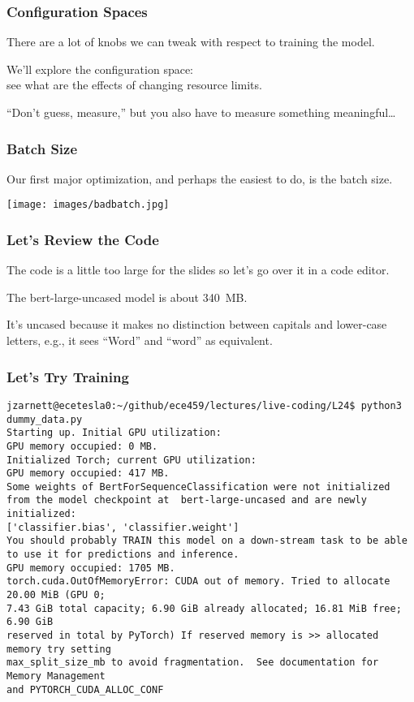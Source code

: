 \begin{frame}
\frametitle{Configuration Spaces}

There are a lot of knobs we can tweak with respect to training the model.

We'll explore the configuration space: \\
\hspace*{2em} see what are the effects of changing resource limits.

``Don't guess, measure,'' but you also have to measure something meaningful\ldots

\end{frame}

\begin{frame}
\frametitle{Batch Size}

Our first major optimization, and perhaps the easiest to do, is the batch size.

\begin{center}
	\texttt{[image: images/badbatch.jpg]}
\end{center}


\end{frame}

\begin{frame}
\frametitle{Let's Review the Code}

The code is a little too large for the slides so let's go over it in a code editor.


The bert-large-uncased model is about 340~MB.

It's uncased because it makes no distinction between capitals and lower-case letters, e.g., it sees ``Word'' and ``word'' as equivalent.

\end{frame}

\begin{frame}[fragile]
\frametitle{Let's Try Training}

{\scriptsize
\begin{verbatim}
jzarnett@ecetesla0:~/github/ece459/lectures/live-coding/L24$ python3 dummy_data.py 
Starting up. Initial GPU utilization:
GPU memory occupied: 0 MB.
Initialized Torch; current GPU utilization:
GPU memory occupied: 417 MB.
Some weights of BertForSequenceClassification were not initialized 
from the model checkpoint at  bert-large-uncased and are newly initialized: 
['classifier.bias', 'classifier.weight']
You should probably TRAIN this model on a down-stream task to be able 
to use it for predictions and inference.
GPU memory occupied: 1705 MB.
torch.cuda.OutOfMemoryError: CUDA out of memory. Tried to allocate 20.00 MiB (GPU 0; 
7.43 GiB total capacity; 6.90 GiB already allocated; 16.81 MiB free; 6.90 GiB 
reserved in total by PyTorch) If reserved memory is >> allocated memory try setting 
max_split_size_mb to avoid fragmentation.  See documentation for Memory Management
and PYTORCH_CUDA_ALLOC_CONF
\end{verbatim}
}

\end{frame}

